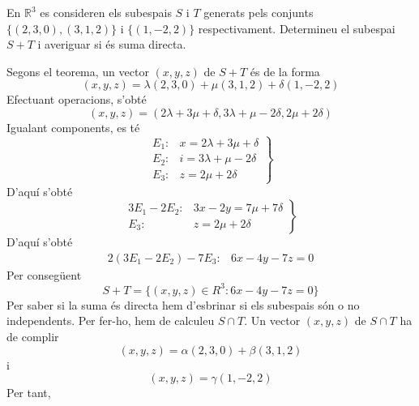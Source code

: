 \begin{exemple}
En $\mathbb{R}^{3}$ es consideren els subespais $S$ i $T$
generats pels conjunts $\{(2,3,0),(3,1,2)\}$ i $\{(1,-2,2)\}$
respectivament. Determineu el subespai $S+T$ i
averiguar si és suma directa.

\end{exemple}
\begin{solucio}
Segons el teorema, un vector $(x,y,z)$ de $S+T$ és de la forma%
\begin{equation*}
(x,y,z)=\lambda (2,3,0)+\mu (3,1,2)+\delta (1,-2,2)
\end{equation*}%
Efectuant operacions, s’obté%
\begin{equation*}
(x,y,z)=(2\lambda +3\mu +\delta ,3\lambda +\mu -2\delta ,2\mu +2\delta )
\end{equation*}%
Igualant components, es té%
\begin{equation*}
\left. 
\begin{array}{ll}
E_{1}: & x=2\lambda +3\mu +\delta \\ 
E_{2}: & i=3\lambda +\mu -2\delta \\ 
E_{3}: & z=2\mu +2\delta%
\end{array}%
\right\}
\end{equation*}%
D’aquí s’obté%
\begin{equation*}
\left. 
\begin{array}{rr}
3E_{1}-2E_{2}: & 3x-2y=7\mu +7\delta \\ 
E_{3}: & z=2\mu +2\delta%
\end{array}%
\right\}
\end{equation*}%
D’aquí s’obté%
\begin{equation*}
\begin{array}{cc}
2(3E_{1}-2E_{2})-7E_{3}: & 6x-4y-7z=0%
\end{array}%
\end{equation*}%
Per consegüent%
\begin{equation*}
S+T=\{(x,y,z)\in R^{3}:6x-4y-7z=0\}
\end{equation*}%
Per saber si la suma és directa hem d’esbrinar si els subespais són o
no independents. Per fer-ho, hem de calculeu $S\cap T$. Un vector $(x,y,z)$
de $S\cap T$ ha de complir%
\begin{equation*}
(x,y,z)=\alpha (2,3,0)+\beta (3,1,2)
\end{equation*}%
i%
\begin{equation*}
(x,y,z)=\gamma (1,-2,2)
\end{equation*}%
Per tant,%
\begin{equation*}

\end{equation*}
\end{solucio}
